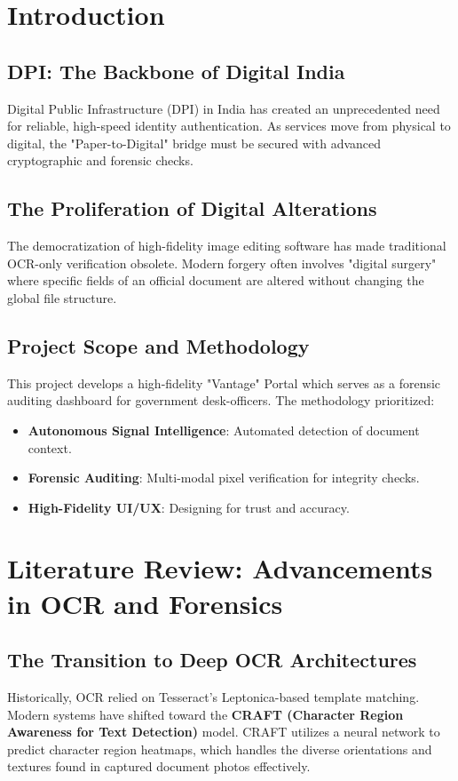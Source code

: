 \documentclass[11pt,a4paper]{article}
\begin{document}
\section{Introduction}

\subsection{DPI: The Backbone of Digital India}
Digital Public Infrastructure (DPI) in India has created an unprecedented need for reliable, high-speed identity authentication. As services move from physical to digital, the "Paper-to-Digital" bridge must be secured with advanced cryptographic and forensic checks.

\subsection{The Proliferation of Digital Alterations}
The democratization of high-fidelity image editing software has made traditional OCR-only verification obsolete. Modern forgery often involves "digital surgery" where specific fields of an official document are altered without changing the global file structure.

\subsection{Project Scope and Methodology}
This project develops a high-fidelity "Vantage" Portal which serves as a forensic auditing dashboard for government desk-officers. The methodology prioritized:
\begin{itemize}
    \item \textbf{Autonomous Signal Intelligence}: Automated detection of document context.
    \item \textbf{Forensic Auditing}: Multi-modal pixel verification for integrity checks.
    \item \textbf{High-Fidelity UI/UX}: Designing for trust and accuracy.
\end{itemize}

\section{Literature Review: Advancements in OCR and Forensics}

\subsection{The Transition to Deep OCR Architectures}
Historically, OCR relied on Tesseract's Leptonica-based template matching. Modern systems have shifted toward the \textbf{CRAFT (Character Region Awareness for Text Detection)} model. CRAFT utilizes a neural network to predict character region heatmaps, which handles the diverse orientations and textures found in captured document photos effectively.
\end{document}
